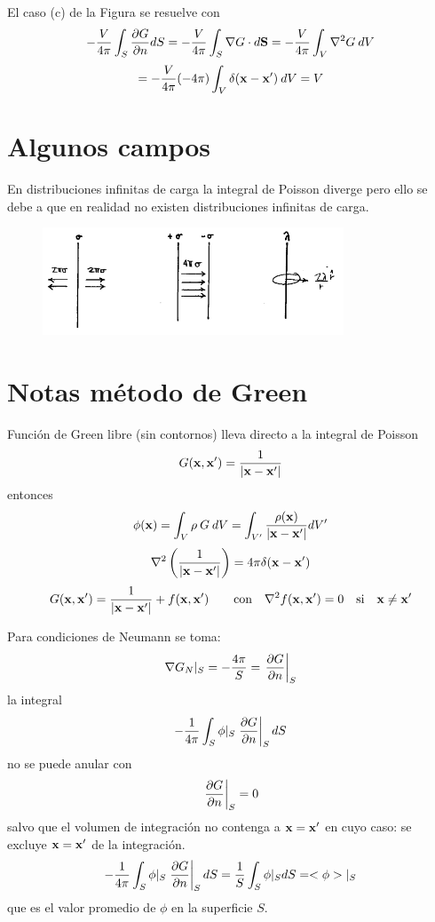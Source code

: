 \documentclass[10pt,oneside]{CBFT_book}
\begin{document}
El caso (c) de la Figura se resuelve con 
\[
	-\frac{V}{4\pi} \int_S \dpar{G}{n} dS = -\frac{V}{4\pi} \int_S \Nabla G\cdot d\vb{S} =
	-\frac{V}{4\pi} \int_V \lapm{G} \: dV	
\]
\[
	= -\frac{V}{4\pi} (-4\pi)\int_V \delta(\vb{x}-\vb{x}') \: dV	= V 
\]

\section{Algunos campos}

En distribuciones infinitas de carga la integral de Poisson diverge pero ello se debe a que en
realidad no existen distribuciones infinitas de carga.
\begin{figure}[thb]
	\begin{center}
	\includegraphics[width=0.8\textwidth]{images/fig_ft1_campohilos.pdf}	 
	\end{center}
	\caption{}
\end{figure} 

\section{Notas método de Green}

Función de Green libre (sin contornos) lleva directo a la integral de Poisson
\[
	G(\vb{x}, \vb{x}') = \frac{1}{|\vb{x} - \vb{x}'|}
\]
entonces 
\[
	\phi(\vb{x}) = \int_V \rho \:G \:dV = \int_{V'} \frac{ \rho(\vb{x}) }{|\vb{x}-\vb{x}'|} dV'
\]
\[
	\nabla^2 \left( \frac{1}{|\vb{x} - \vb{x}'|} \right) = 4\pi \delta(\vb{x}-\vb{x}')
\]
\[
	G(\vb{x}, \vb{x}') =  \frac{1}{|\vb{x} - \vb{x}'|} + f(\vb{x}, \vb{x}') \qquad 
	\textrm{con} \quad \lapm{f}(\vb{x}, \vb{x}') = 0 \quad \textrm{si} \quad \vb{x}\neq\vb{x}'
\]

Para condiciones de Neumann se toma:
\[
	\mathbf{\nabla} G_N|_S = -\frac{4\pi}{S} = \left. \frac{\partial^{\hspace{-0.05em}} {G}}{\partial {n}^{\hspace{-0.05em}}} \right|_S
\]
la integral 
\[
	- \frac{1}{4\pi} \int_S \phi|_S \left.\frac{\partial^{\hspace{-0.05em}} {G}}{\partial {n}^{\hspace{-0.05em}}}\right|_S  dS
\]
no se puede anular con 
\[
	\left.\frac{\partial^{\hspace{-0.05em}} {G}}{\partial {n}^{\hspace{-0.05em}}}\right|_S = 0
\]
salvo que el volumen de integración no contenga a $\vb{x}=\vb{x}'$ en cuyo caso:
se excluye $\vb{x}=\vb{x}'$ de la integración.
\[
	- \frac{1}{4\pi} \int_S \phi|_S \left.\frac{\partial^{\hspace{-0.05em}} {G}}{\partial {n}^{\hspace{-0.05em}}}\right|_S  dS =
	\frac{1}{S} \int_S \phi|_S dS = <\phi>|_S
\]
que es el valor promedio de $\phi$ en la superficie $S$.
\end{document}
